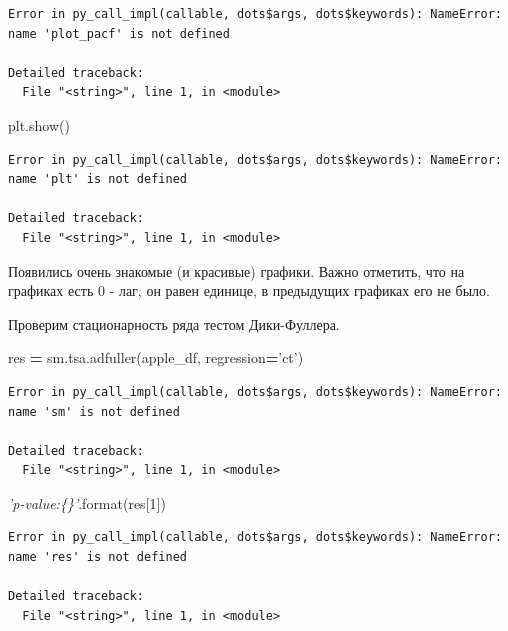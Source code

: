 \documentclass[]{book}
\newenvironment{Shaded}{\begin{snugshade}}{\end{snugshade}}
\newcommand{\BuiltInTok}[1]{#1}
\newcommand{\CommentTok}[1]{\textcolor[rgb]{0.56,0.35,0.01}{\textit{#1}}}
\newcommand{\DecValTok}[1]{\textcolor[rgb]{0.00,0.00,0.81}{#1}}
\newcommand{\NormalTok}[1]{#1}
\newcommand{\OperatorTok}[1]{\textcolor[rgb]{0.81,0.36,0.00}{\textbf{#1}}}
\newcommand{\StringTok}[1]{\textcolor[rgb]{0.31,0.60,0.02}{#1}}
\begin{document}
\begin{verbatim}
Error in py_call_impl(callable, dots$args, dots$keywords): NameError: name 'plot_pacf' is not defined

Detailed traceback: 
  File "<string>", line 1, in <module>
\end{verbatim}

\begin{Shaded}
\begin{Highlighting}[]
\NormalTok{plt.show()}
\end{Highlighting}
\end{Shaded}

\begin{verbatim}
Error in py_call_impl(callable, dots$args, dots$keywords): NameError: name 'plt' is not defined

Detailed traceback: 
  File "<string>", line 1, in <module>
\end{verbatim}

Появились очень знакомые (и красивые) графики. Важно отметить, что на графиках есть 0 - лаг, он равен единице, в предыдущих графиках его не было.

Проверим стационарность ряда тестом Дики-Фуллера.

\begin{Shaded}
\begin{Highlighting}[]
\NormalTok{res }\OperatorTok{=}\NormalTok{ sm.tsa.adfuller(apple_df, regression}\OperatorTok{=}\StringTok{'ct'}\NormalTok{)}
\end{Highlighting}
\end{Shaded}

\begin{verbatim}
Error in py_call_impl(callable, dots$args, dots$keywords): NameError: name 'sm' is not defined

Detailed traceback: 
  File "<string>", line 1, in <module>
\end{verbatim}

\begin{Shaded}
\begin{Highlighting}[]
\CommentTok{'p-value:\{\}'}\NormalTok{.}\BuiltInTok{format}\NormalTok{(res[}\DecValTok{1}\NormalTok{])}
\end{Highlighting}
\end{Shaded}

\begin{verbatim}
Error in py_call_impl(callable, dots$args, dots$keywords): NameError: name 'res' is not defined

Detailed traceback: 
  File "<string>", line 1, in <module>
\end{verbatim}
\end{document}
